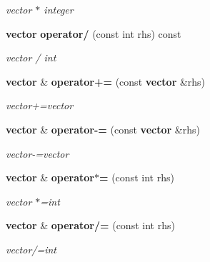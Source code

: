 \begin{DoxyCompactItemize}
\begin{DoxyCompactList}\small\item\em vector $\ast$ integer \end{DoxyCompactList}\item 
{\bf vector} {\bf operator/} (const int rhs) const \label{classvector_a27d19ecae377502ac3d2c0c39837ebcf}

\begin{DoxyCompactList}\small\item\em vector / int \end{DoxyCompactList}\item 
{\bf vector} \& {\bf operator+=} (const {\bf vector} \&rhs)\label{classvector_acf4c6a4d343c92e211f80de7712a3cac}

\begin{DoxyCompactList}\small\item\em vector+=vector \end{DoxyCompactList}\item 
{\bf vector} \& {\bf operator-\/=} (const {\bf vector} \&rhs)\label{classvector_a9f6cf8d24ca60a5bec617c364172d89f}

\begin{DoxyCompactList}\small\item\em vector-\/=vector \end{DoxyCompactList}\item 
{\bf vector} \& {\bf operator$\ast$=} (const int rhs)\label{classvector_ab719e6dfed904db0c0da869e71bd6580}

\begin{DoxyCompactList}\small\item\em vector $\ast$=int \end{DoxyCompactList}\item 
{\bf vector} \& {\bf operator/=} (const int rhs)\label{classvector_a40b51780c43e4ad73a3171a19f8739c1}

\begin{DoxyCompactList}\small\item\em vector/=int \end{DoxyCompactList}\end{DoxyCompactItemize}
